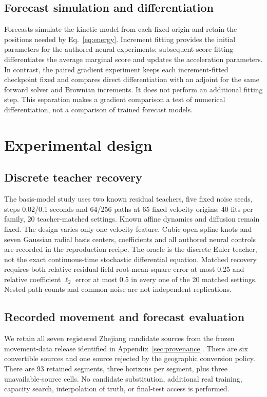 \documentclass[11pt]{article}
\begin{document}
\subsection{Forecast simulation and differentiation}
Forecasts simulate the kinetic model from each fixed origin and retain the positions needed by Eq.~\eqref{eq:energy}. Increment fitting provides the initial parameters for the authored neural experiments; subsequent score fitting differentiates the average marginal score and updates the acceleration parameters. In contrast, the paired gradient experiment keeps each increment-fitted checkpoint fixed and compares direct differentiation with an adjoint for the same forward solver and Brownian increments. It does not perform an additional fitting step. This separation makes a gradient comparison a test of numerical differentiation, not a comparison of trained forecast models.

\section{Experimental design}\label{sec:design}
\subsection{Discrete teacher recovery}\label{sec:recovery-design}
The basis-model study uses two known residual teachers, five fixed noise seeds, steps 0.02/0.1 seconds and 64/256 paths at 65 fixed velocity origins: 40 fits per family, 20 teacher-matched settings. Known affine dynamics and diffusion remain fixed. The design varies only one velocity feature. Cubic open spline knots and seven Gaussian radial basis centers, coefficients and all authored neural controls are recorded in the reproduction recipe. The oracle is the discrete Euler teacher, not the exact continuous-time stochastic differential equation. Matched recovery requires both relative residual-field root-mean-square error at most 0.25 and relative coefficient $\ell_2$ error at most 0.5 in every one of the 20 matched settings. Nested path counts and common noise are not independent replications.

\subsection{Recorded movement and forecast evaluation}\label{sec:real-design}
We retain all seven registered Zhejiang candidate sources from the frozen movement-data release identified in Appendix~\ref{sec:provenance}. There are six convertible sources and one source rejected by the geographic conversion policy. There are 93 retained segments, three horizons per segment, plus three unavailable-source cells. No candidate substitution, additional real training, capacity search, interpolation of truth, or final-test access is performed.
\end{document}
